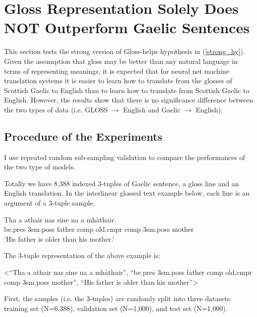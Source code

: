 \documentclass[a4paper]{article}
\begin{document}
\section{Gloss Representation Solely Does NOT Outperform Gaelic Sentences} \label{gd_to_gl_to_en}
This section tests the strong version of Gloss-helps hypothesis in (\ref{strong_hy}).
Given the assumption that gloss may be better than any natural language in terms of representing meanings, it is expected that for neural net machine translation systems it is easier to learn how to translate from the glosses of Scottish Gaelic to English than to learn how to translate from Scottish Gaelic to English. However, the results show that there is no significance difference between the two types of data (i.e. GLOSS $\rightarrow$ English and Gaelic $\rightarrow$ English). 

\subsection{Procedure of the Experiments}
I use repeated random sub-sampling validation to compare the performances of the two type of models.

Totally we have 8,388 indexed 3-tuples of Gaelic sentence, a gloss line and an English translation. In the interlinear glossed text example below, each line is an argument of a 3-tuple sample. 

\begin{exe}  
\ex \gll    Tha a athair nas sine na a mh\`athair.\\  
            be.pres 3sm.poss father comp old.cmpr comp 3sm.poss mother
\\  
    \glt    `His father is older than his mother.'  
\end{exe}

The 3-tuple representation of the above example is:
\begin{exe}
 \ex <``Tha a athair nas sine na a mh\`athair'', ``be.pres 3sm.poss father comp old.cmpr comp 3sm.poss mother'', ``His father is older than his mother''>
\end{exe}

First, the samples (i.e. the 3-tuples) are randomly split into three datasets: training set (N=6,388), validation set (N=1,000), and test set (N=1,000). 
\end{document}
